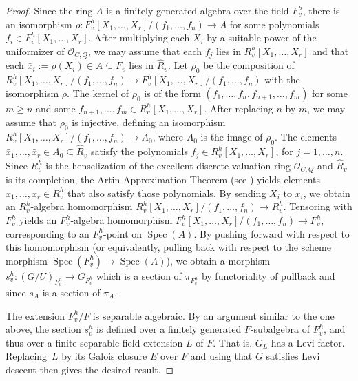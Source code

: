 \documentclass[12pt]{amsart}
\newcommand{\mc}[1]{\mathcal #1}
\newcommand{\wh}{\widehat}
\newcommand{\Spec}{\operatorname{Spec}}
\theoremstyle{plain}
\theoremstyle{definition}
\theoremstyle{remark}
\begin{document}
\begin{proof}
Since the ring $A$ is a finitely generated algebra over the field $F_v^h$,
there is an isomorphism 
$\rho:F_v^h[X_1,\dots,X_r]/(f_1,\dots,f_n) \to A$ for some polynomials
$f_i \in F_v^h[X_1,\dots,X_r]$.  After multiplying each $X_i$ by a suitable power of the uniformizer of $\mc O_{C,Q}$, we may assume that each $f_j$ lies in $R_v^h[X_1,\dots,X_r]$ and that each $\bar x_i := \rho(X_i) \in A \subseteq F_v$ lies in $\wh R_v$.   
Let $\rho_0$ be the composition of 
$R_v^h[X_1,\dots,X_r]/(f_1,\dots,f_n)\to F_v^h[X_1,\dots,X_r]/(f_1,\dots,f_n)$ with the isomorphism $\rho$.
The kernel of $\rho_0$ is of the form $(f_1,\dots,f_n,f_{n+1},\dots,f_m)$ for some $m \ge n$ and some $f_{n+1},\dots,f_m \in R_v^h[X_1,\dots,X_r]$.  
After replacing $n$ by $m$, we may assume that $\rho_0$ is injective, 
defining an isomorphism $R_v^h[X_1,\dots,X_r]/(f_1,\dots,f_n) \to A_0$,
where $A_0$ is the image of $\rho_0$.
The elements $\bar x_1,\dots,\bar x_r \in A_0\subseteq \wh R_v$ 
satisfy the polynomials $f_j \in R_v^h[X_1,\dots,X_r]$, for $j=1,\dots,n$.  
Since $R_v^h$ is the henselization of the excellent discrete valuation ring ${\mc O}_{C,Q}$ and $\wh R_v$ is its completion, the Artin Approximation Theorem (see \cite[Theorem~1.10]{Art}) yields elements $x_1,\dots,x_r \in R_v^h$ that also satisfy those polynomials.  
By sending $X_i$ to $x_i$, we obtain an $R_v^h$-algebra homomorphism $R_v^h[X_1,\dots,X_r]/(f_1,\dots,f_n) \to R_v^h$.  Tensoring with $F_v^h$ yields an $F_v^h$-algebra homomorphism $F_v^h[X_1,\dots,X_r]/(f_1,\dots,f_n) \to F_v^h$, corresponding to an $F_v^h$-point on $\Spec(A)$.  By pushing forward with respect to this homomorphism (or equivalently, pulling back with respect to the scheme morphism $\Spec(F_v^h) \to \Spec(A)$), we obtain a morphism $s_v^h:(G/U)_{F_v^h}\rightarrow G_{F_v^h}$ which is a section of $\pi_{F_v^h}$ by functoriality
of pullback and since $s_A$ is a section of $\pi_A$.

The extension $F_v^h/F$ is separable algebraic. By an argument similar to the one above, the section $s_v^h$ is defined over a finitely generated $F$-subalgebra of $F_v^h$, and thus over a finite separable field extension $L$ of $F$.  That is, $G_L$ has a Levi factor. Replacing~$L$ by its Galois closure $E$ over $F$ and using that $G$ satisfies Levi descent then gives the desired result.
\end{proof}
\end{document}
